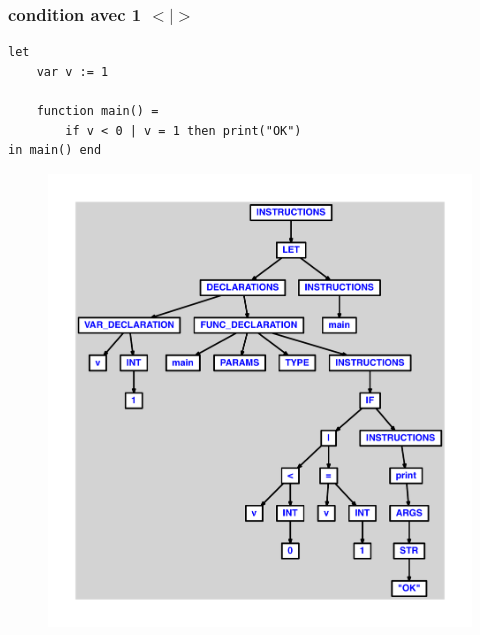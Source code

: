 \documentclass{article}
\begin{document}
\subsubsection{condition avec 1 $ < $$ | $$ > $}
\begin{lstlisting}
let
	var v := 1

	function main() =
		if v < 0 | v = 1 then print("OK")
in main() end
\end{lstlisting}
\newpage
\begin{figure}[H]
\centering
\includegraphics[max width=\textwidth]{ast/ast_282.pdf}
\end{figure}
\newpage
\end{document}
